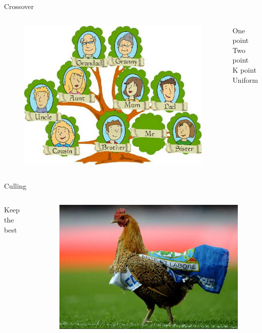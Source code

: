 \documentclass[18pt]{beamer}
\begin{document}
    \begin{frame}{Crossover}
        \begin{columns}
                \begin{figure}
                \includegraphics[scale=0.3]{family}
                \end{figure}
                One point\\
                Two point\\
                K point\\
                Uniform
        \end{columns}
    \end{frame}

    \begin{frame}{Culling}
        \begin{columns}
                Keep the best
                \begin{figure}
                \includegraphics[scale=1]{chicken}
                \end{figure}
        \end{columns}
    \end{frame}
\end{document}
